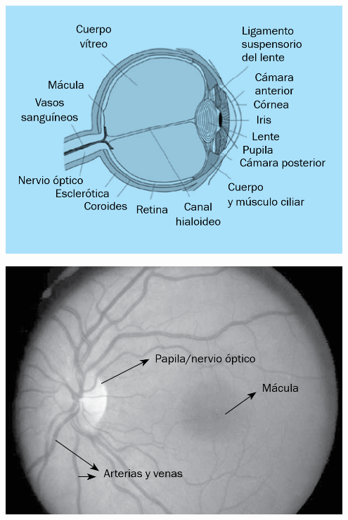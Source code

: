 \documentclass[xcolor=dvipsnames]{beamer}
\begin{document}
\begin{frame}
    \begin{center}
        \begin{minipage}{0.35\textwidth}
            \centering
            \includegraphics[width=0.95\textwidth]{../imaxes/ojo1.png}
        \end{minipage}
        \hspace{0.05\textwidth}
        \begin{minipage}{0.35\textwidth}
            \centering
            \includegraphics[width=0.95\textwidth]{../imaxes/ojo2.png}
        \end{minipage}
    \end{center}

\end{frame}
\end{document}
